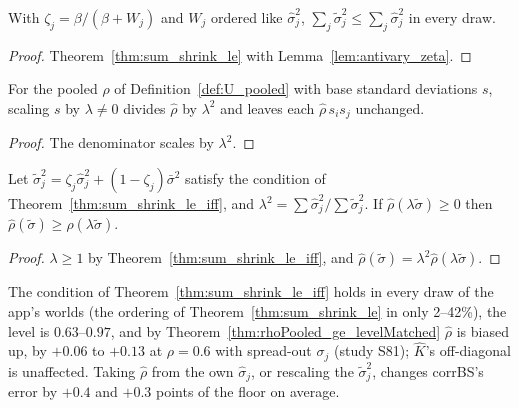 \begin{theorem}\label{thm:sum_sigTilde_le}
  \leanok
  With $\zeta_j = \beta/(\beta + W_j)$ and $W_j$ ordered like $\hat\sigma_j^2$,
  $\sum_j\tilde\sigma_j^2 \le \sum_j\hat\sigma_j^2$ in every draw.
\end{theorem}
\begin{proof}
  \leanok
  Theorem~\ref{thm:sum_shrink_le} with Lemma~\ref{lem:antivary_zeta}.
\end{proof}

\begin{theorem}\label{thm:rhoPooled_smul}
  \leanok
  For the pooled $\hat\rho$ of Definition~\ref{def:U_pooled} with base standard deviations $s$, scaling $s$
  by $\lambda \ne 0$ divides $\hat\rho$ by $\lambda^2$ and leaves each $\hat\rho\,s_is_j$ unchanged.
\end{theorem}
\begin{proof}
  \leanok
  The denominator scales by $\lambda^2$.
\end{proof}

\begin{theorem}\label{thm:rhoPooled_ge_levelMatched}
  \leanok
  Let $\tilde\sigma_j^2 = \zeta_j\hat\sigma_j^2 + (1-\zeta_j)\bar\sigma^2$ satisfy the condition of
  Theorem~\ref{thm:sum_shrink_le_iff}, and $\lambda^2 = \sum\hat\sigma_j^2/\sum\tilde\sigma_j^2$. If
  $\hat\rho(\lambda\tilde\sigma) \ge 0$ then $\hat\rho(\tilde\sigma) \ge \hat\rho(\lambda\tilde\sigma)$.
\end{theorem}
\begin{proof}
  \leanok
  $\lambda \ge 1$ by Theorem~\ref{thm:sum_shrink_le_iff}, and $\hat\rho(\tilde\sigma) = \lambda^2\hat\rho(\lambda\tilde\sigma)$.
\end{proof}

\begin{remark}\label{rem:rhoLevel}
  The condition of Theorem~\ref{thm:sum_shrink_le_iff} holds in every draw of the app's worlds (the ordering of
  Theorem~\ref{thm:sum_shrink_le} in only 2--42\%), the level is $0.63$--$0.97$, and by
  Theorem~\ref{thm:rhoPooled_ge_levelMatched} $\hat\rho$ is biased up, by $+0.06$ to $+0.13$ at $\rho = 0.6$ with spread-out
  $\sigma_j$ (study S81); $\hat K$'s off-diagonal is unaffected. Taking $\hat\rho$ from the own $\hat\sigma_j$, or
  rescaling the $\tilde\sigma_j^2$, changes corrBS's error by $+0.4$ and $+0.3$ points of the floor on average.
\end{remark}

